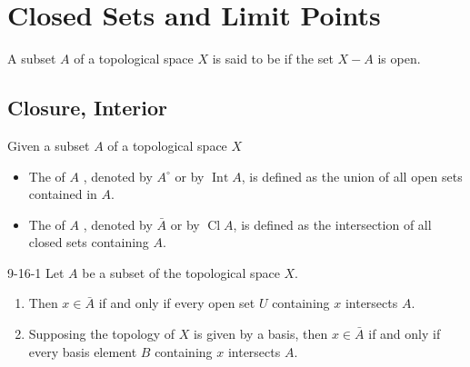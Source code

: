 \documentclass[../main.tex]{subfiles}
\begin{document}
\section{Closed Sets and Limit Points}
\begin{definition}{}{}
A subset $A$ of a topological space $X$ is said to be  if the set $X - A$ is open.
\end{definition}

\subsection{Closure, Interior}

\begin{definition}{}{}
    Given a subset $A$ of a topological space $X$
    \begin{itemize}
        \item The  of $A$ , denoted by \(  A^{\circ}  \) or by \(  \operatorname{Int}A  \),  is defined as the union of all open sets contained in $A$.
        \item The  of $A$ , denoted by \( \bar{A}\) or by \(  \operatorname{Cl}A  \),  is defined as the intersection of all closed sets containing $A$.
    \end{itemize}
\end{definition}

\begin{theorem}{}{9-16-1}
Let $A$ be a subset of the topological space $X$.
\begin{enumerate}
\item[(a)] Then $x \in \bar{A}$ if and only if every open set $U$ containing $x$ intersects $A$.
\item[(b)] Supposing the topology of $X$ is given by a basis, then $x \in \bar{A}$ if and only if every basis element $B$ containing $x$ intersects $A$.
\end{enumerate}
\end{theorem}
\end{document}
